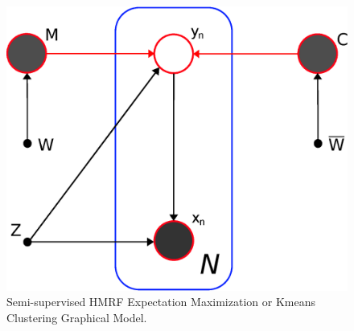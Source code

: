 \documentclass[dvips,dvipdfm,pdftex]{llncs}
\begin{document}
\begin{figure}[h]
	\begin{center}
		\includegraphics[scale=0.40]{figures/SemiSupervised_HMRF_EM_Graphical_Model.eps}
		\caption{Semi-supervised HMRF Expectation Maximization or Kmeans Clustering Graphical Model.}
		\label{fig:hmrf_em}
	\end{center}
\end{figure}




\end{document}
